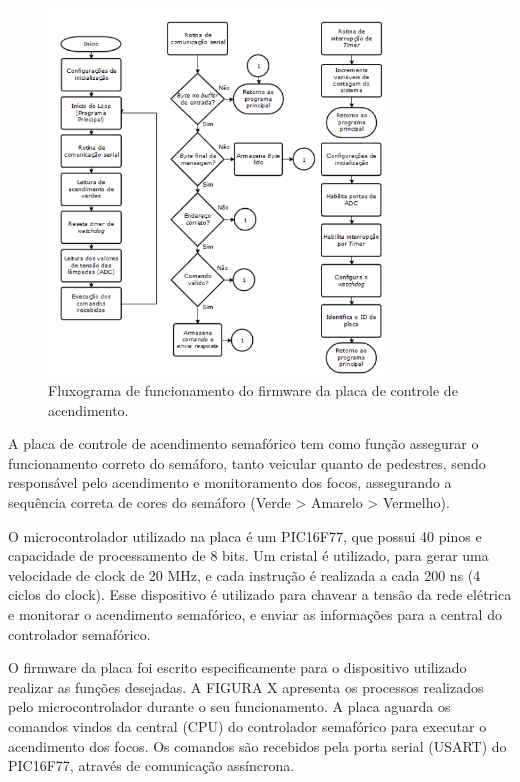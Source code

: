 \begin{figure}[ht]
    \begin{center}
    \includegraphics[width=0.8\textwidth]{figuras/fluxo_fase.PNG}
    \end{center}
    \caption[Placa de fase]{Fluxograma de funcionamento do firmware da placa de controle de acendimento.}
    \label{placa_fase}
\end{figure}

A placa de controle de acendimento semafórico tem como função assegurar o funcionamento correto do semáforo, tanto veicular quanto de pedestres, sendo responsável pelo acendimento e monitoramento dos focos, assegurando a sequência correta de cores do semáforo (Verde > Amarelo > Vermelho).

O microcontrolador utilizado na placa é um PIC16F77, que possui 40 pinos e capacidade de processamento de 8 bits. Um cristal é utilizado, para gerar uma velocidade de clock de 20 MHz, e cada instrução é realizada a cada 200 ns (4 ciclos do clock). Esse dispositivo é utilizado para chavear a tensão da rede elétrica e monitorar o acendimento semafórico, e enviar as informações para a central do controlador semafórico.

O firmware da placa foi escrito especificamente para o dispositivo utilizado realizar as funções desejadas. A FIGURA X apresenta os processos realizados pelo microcontrolador durante o seu funcionamento. A placa aguarda os comandos vindos da central (CPU) do controlador semafórico para executar o acendimento dos focos. Os comandos são recebidos pela porta serial (USART) do PIC16F77, através de comunicação assíncrona.

